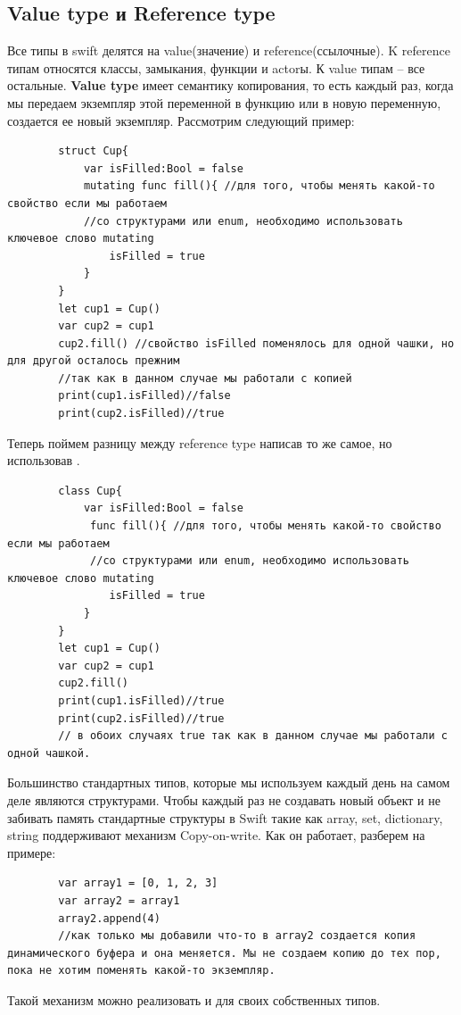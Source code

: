 \documentclass{article}
\begin{document}
    \subsection{Value type и Reference type}
    Все типы в swift делятся на value(значение) и reference(ссылочные). K reference типам относятся классы, замыкания, функции и actorы. К value типам -- все остальные. 
    \newline
    \textbf{Value type} имеет семантику копирования, то есть каждый раз, когда мы передаем экземпляр этой переменной в функцию или в новую переменную, создается ее новый экземпляр. Рассмотрим следующий пример: 
    \begin{verbatim}
        struct Cup{
            var isFilled:Bool = false
            mutating func fill(){ //для того, чтобы менять какой-то свойство если мы работаем
            //со структурами или enum, необходимо использовать ключевое слово mutating
                isFilled = true       
            }
        }
        let cup1 = Cup()
        var cup2 = cup1
        cup2.fill() //свойство isFilled поменялось для одной чашки, но для другой осталось прежним
        //так как в данном случае мы работали с копией 
        print(cup1.isFilled)//false
        print(cup2.isFilled)//true
    \end{verbatim}
    Теперь поймем разницу между reference type написав то же самое, но использовав .
    \begin{verbatim}
        class Cup{
            var isFilled:Bool = false
             func fill(){ //для того, чтобы менять какой-то свойство если мы работаем
             //со структурами или enum, необходимо использовать ключевое слово mutating
                isFilled = true       
            }
        }
        let cup1 = Cup()
        var cup2 = cup1
        cup2.fill() 
        print(cup1.isFilled)//true 
        print(cup2.isFilled)//true 
        // в обоих случаях true так как в данном случае мы работали с одной чашкой.
    \end{verbatim}
    Большинство стандартных типов, которые мы используем каждый день на самом деле являются структурами. 
    \newline
    Чтобы каждый раз не создавать новый объект и не забивать память стандартные структуры в Swift такие как array, set, dictionary, string поддерживают механизм Copy-on-write. Как он работает, разберем на примере: 
    \begin{verbatim}
        var array1 = [0, 1, 2, 3]
        var array2 = array1
        array2.append(4)
        //как только мы добавили что-то в array2 создается копия динамического буфера и она меняется. Мы не создаем копию до тех пор, пока не хотим поменять какой-то экземпляр. 
    \end{verbatim}
    Такой механизм можно реализовать и для своих собственных типов. 
\end{document}
